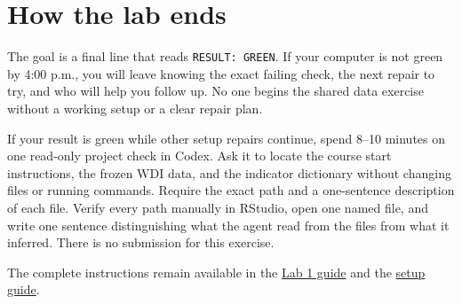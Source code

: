 \documentclass[11pt,letterpaper]{article}
\begin{document}
\section*{How the lab ends}

The goal is a final line that reads \texttt{RESULT: GREEN}. If your computer is
not green by 4:00 p.m., you will leave knowing the exact failing check, the next
repair to try, and who will help you follow up. No one begins the shared data
exercise without a working setup or a clear repair plan.

If your result is green while other setup repairs continue, spend 8--10 minutes
on one read-only project check in Codex. Ask it to locate the course start
instructions, the frozen WDI data, and the indicator dictionary without
changing files or running commands. Require the exact path and a one-sentence
description of each file. Verify every path manually in RStudio, open one named
file, and write one sentence distinguishing what the agent read from the files
from what it inferred. There is no submission for this exercise.

The complete instructions remain available in the
\href{https://harvard-api209.github.io/math-camp/labs/lab-1/}{Lab 1 guide} and
the \href{https://harvard-api209.github.io/math-camp/setup/}{setup guide}.
\end{document}
